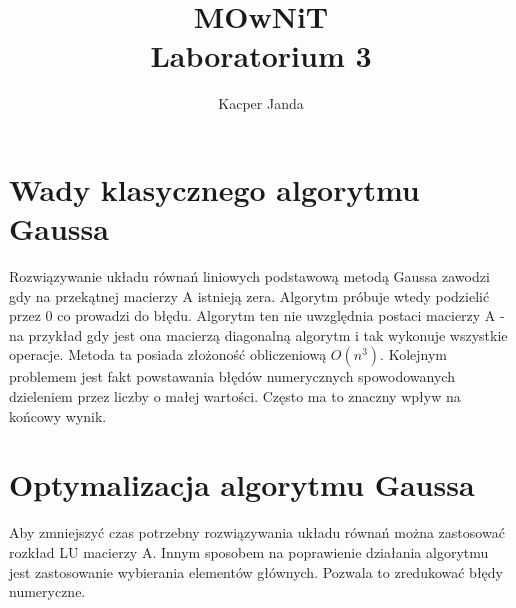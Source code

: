 \documentclass[11pt, a4paper]{article}
\begin{document}
\title{MOwNiT\\Laboratorium 3}
\author{Kacper Janda}
\date{}
\maketitle

\section{Wady klasycznego algorytmu Gaussa}
Rozwiązywanie układu równań liniowych podstawową metodą Gaussa zawodzi gdy na przekątnej macierzy A istnieją zera. Algorytm próbuje wtedy podzielić przez \begin{math} 0 \end{math} co prowadzi do błędu. Algorytm ten nie uwzględnia postaci macierzy A - na przykład gdy jest ona macierzą diagonalną algorytm i tak wykonuje wszystkie operacje. Metoda ta posiada złożoność obliczeniową \begin{math} O(n^3) \end{math}. Kolejnym problemem jest fakt powstawania błędów numerycznych spowodowanych dzieleniem przez liczby o małej wartości. Często ma to znaczny wpływ na końcowy wynik.\\

\section{Optymalizacja algorytmu Gaussa}
Aby zmniejszyć czas potrzebny rozwiązywania układu równań można zastosować rozkład LU macierzy A. Innym sposobem na poprawienie działania algorytmu jest zastosowanie wybierania elementów głównych. Pozwala to zredukować błędy numeryczne.\\
\end{document}
